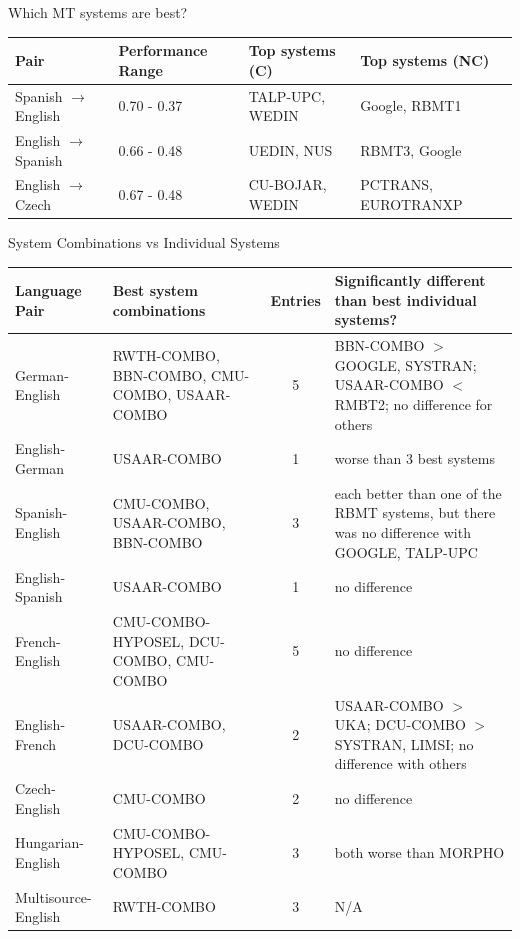 \begin{frame}{Which MT systems are best?}
\begin{table}
\centering
    \begin{tabularx}{\textwidth}{lLLL}
\toprule
Pair & Performance Range & Top systems (C) & Top systems (NC) \\
\midrule
Spanish $\rightarrow$ English & 0.70 - 0.37 & TALP-UPC, WEDIN & Google, RBMT1 \\
English $\rightarrow$ Spanish & 0.66 - 0.48 & UEDIN, NUS & RBMT3, Google \\
English $\rightarrow$ Czech & 0.67 - 0.48 & CU-BOJAR, WEDIN & PCTRANS, EUROTRANXP \\
\bottomrule
\end{tabularx}
\end{table}
\end{frame}

\begin{frame}{System Combinations vs Individual Systems}
    \footnotesize
    \begin{table}[htbp]
\centering
        \begin{tabular}{l P{1.7in} c P{2in}}
\toprule
\textbf{Language Pair} & \textbf{Best system combinations} & \textbf{Entries} & \textbf{Significantly different than best individual systems?} \\
\midrule

German-English 
& RWTH-COMBO, BBN-COMBO, CMU-COMBO, USAAR-COMBO 
& 5 
& BBN-COMBO $>$ GOOGLE, SYSTRAN; USAAR-COMBO $<$ RMBT2; no difference for others \\

English-German 
& USAAR-COMBO 
& 1 
& worse than 3 best systems \\

Spanish-English 
& CMU-COMBO, USAAR-COMBO, BBN-COMBO 
& 3 
& each better than one of the RBMT systems, but there was no difference with GOOGLE, TALP-UPC \\

English-Spanish 
& USAAR-COMBO 
& 1 
& no difference \\

French-English 
& CMU-COMBO-HYPOSEL, DCU-COMBO, CMU-COMBO 
& 5 
& no difference \\

English-French 
& USAAR-COMBO, DCU-COMBO 
& 2 
& USAAR-COMBO $>$ UKA; DCU-COMBO $>$ SYSTRAN, LIMSI; no difference with others \\

Czech-English 
& CMU-COMBO 
& 2 
& no difference \\

Hungarian-English 
& CMU-COMBO-HYPOSEL, CMU-COMBO 
& 3 
& both worse than MORPHO \\

Multisource-English 
& RWTH-COMBO 
& 3
& N/A \\

\bottomrule
\end{tabular}
\end{table}
\end{frame}

